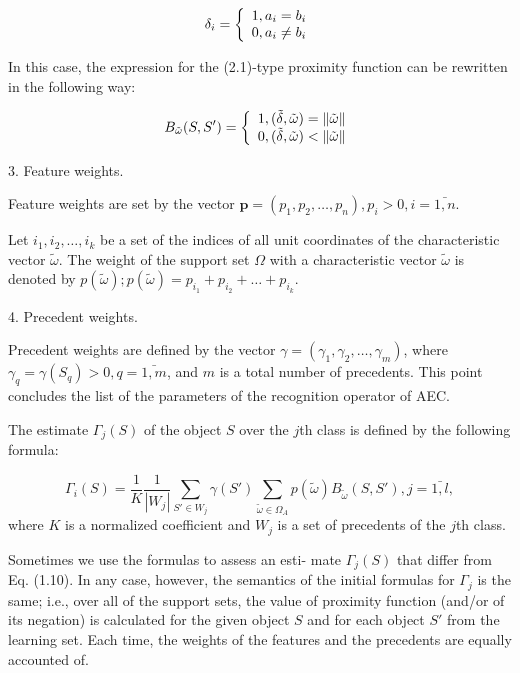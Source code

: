 \begin{equation}
\delta_i = \left\{ 
  \begin{array}{l l}
    1, a_i = b_i \\
    0, a_i \neq b_i
  \end{array} \right.
\end{equation}

In this case, the expression for the (2.1)-type proximity 
function can be rewritten in the following way:

\begin{equation}
B_{\tilde{\omega}}(S, S') = \left\{ 
  \begin{array}{l l}
    1, (\tilde{\delta}, \tilde{\omega}) = \|\tilde{\omega}\| \\
    0, (\tilde{\delta}, \tilde{\omega}) < \|\tilde{\omega}\|
  \end{array} \right.
\end{equation}

3. Feature weights. 

Feature weights are set by the vector 
$\textbf{p} = (p_1, p_2, \ldots, p_n), p_i > 0, i = \bar{1, n}$. 

Let ${i_1, i_2, \ldots, i_k}$ be a set of the indices of all unit 
coordinates of the characteristic vector $\tilde{\omega}$. The weight 
of the support set $\Omega$ with a characteristic vector $\tilde{\omega}$ 
is denoted by $p(\tilde{\omega});  p(\tilde{\omega}) = p_{i_1} + p_{i_2} + \ldots+ p_{i_k}$.

4. Precedent weights.

Precedent weights are defined by the vector 
$ \gamma = (\gamma_1, \gamma_2, \ldots, \gamma_{m})$, 
where $\gamma_q = \gamma(S_q)>0, q = \bar{1, m} $, and $m$ is a 
total number of precedents. This point concludes the list of 
the parameters of the recognition operator of AEC.

The estimate $\Gamma_j(S)$ of the object $S$ over the $j$th class 
is defined by the following formula:

\begin{equation}
\Gamma_i(S) = \frac{1}{K}\frac{1}{|W_j|}\sum_{S'\in W_j}\gamma(S')\sum_{\tilde{\omega}\in\Omega_A}p(\tilde{\omega})B_{\tilde{\omega}}(S, S'), j = \bar{1, l},
\end{equation}
where $K$ is a normalized coefficient and $W_j$ is a set of precedents of the $j$th class. 

Sometimes we use the formulas to assess an esti- mate $\Gamma_j(S)$ that differ from 
Eq. (1.10). In any case, however, the semantics of the initial formulas for $\Gamma_j$
is the same; i.e., over all of the support sets, the value of proximity function 
(and/or of its negation) is calculated for the given object $S$ and for each object $S'$ 
from the learning set. Each time, the weights of the features and the precedents 
are equally accounted of.

